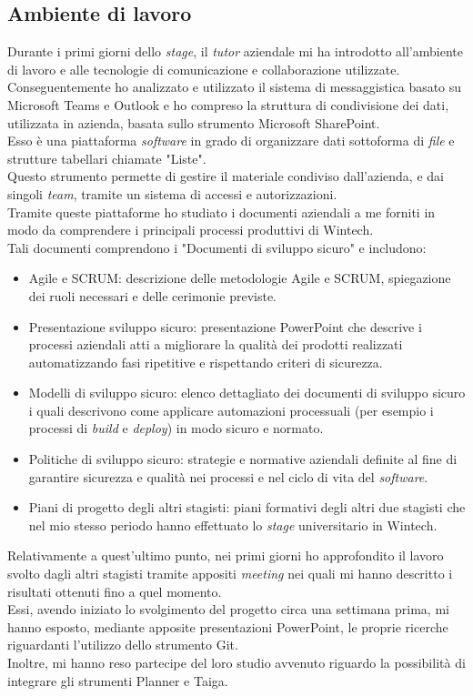 \subsection{Ambiente di lavoro}
Durante i primi giorni dello \emph{stage}, il \emph{tutor} aziendale mi ha introdotto all'ambiente di lavoro e alle tecnologie di comunicazione e collaborazione utilizzate.\\
Conseguentemente ho analizzato e utilizzato il sistema di messaggistica basato su Microsoft Teams e Outlook e ho compreso la struttura di condivisione dei dati, utilizzata in azienda, basata sullo strumento Microsoft SharePoint.\\
Esso è una piattaforma \emph{software} in grado di organizzare dati sottoforma di \emph{file} e strutture tabellari chiamate "Liste".\\
Questo strumento permette di gestire il materiale condiviso dall'azienda, e dai singoli \emph{team}, tramite un sistema di accessi e autorizzazioni.\\
Tramite queste piattaforme ho studiato i documenti aziendali a me forniti in modo da comprendere i principali processi produttivi di Wintech.\\ 
Tali documenti comprendono i "Documenti di sviluppo sicuro" e includono:
\begin{itemize}
    \item Agile e SCRUM: descrizione delle metodologie Agile e SCRUM, spiegazione dei ruoli necessari e delle cerimonie previste. 
    \item Presentazione sviluppo sicuro: presentazione PowerPoint che descrive i processi aziendali atti a migliorare la qualità dei prodotti realizzati automatizzando fasi ripetitive e rispettando criteri di sicurezza. 
    \item Modelli di sviluppo sicuro: elenco dettagliato dei documenti di sviluppo sicuro i quali descrivono come applicare automazioni processuali (per esempio i processi di \emph{build} e \emph{deploy}) in modo sicuro e normato. 
    \item Politiche di sviluppo sicuro: strategie e normative aziendali definite al fine di garantire sicurezza e qualità nei processi e nel ciclo di vita del \emph{software}. 
    \item Piani di progetto degli altri stagisti: piani formativi degli altri due stagisti che nel mio stesso periodo hanno effettuato lo \emph{stage} universitario in Wintech. 
\end{itemize}
Relativamente a quest'ultimo punto, nei primi giorni ho approfondito il lavoro svolto dagli altri stagisti tramite appositi \emph{meeting} nei quali mi hanno descritto i risultati ottenuti fino a quel momento.\\
Essi, avendo iniziato lo svolgimento del progetto circa una settimana prima, mi hanno esposto, mediante apposite presentazioni PowerPoint, le proprie ricerche riguardanti l'utilizzo dello strumento Git.\\
Inoltre, mi hanno reso partecipe del loro studio avvenuto riguardo la possibilità di integrare gli strumenti Planner e Taiga. 

